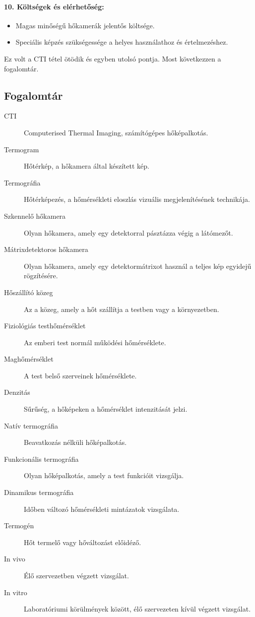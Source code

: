 \documentclass[a4paper,12pt]{article}
\begin{document}
\paragraph{10. Költségek és elérhetőség:} \begin{itemize} \item Magas minőségű hőkamerák jelentős költsége. \item Speciális képzés szükségessége a helyes használathoz és értelmezéshez. \end{itemize}

Ez volt a CTI tétel ötödik és egyben utolsó pontja. Most következzen a fogalomtár.

\subsection{Fogalomtár} 

\begin{description} \item[CTI] Computerised Thermal Imaging, számítógépes hőképalkotás.

\item[Termogram] Hőtérkép, a hőkamera által készített kép. \item[Termográfia] Hőtérképezés, a hőmérsékleti eloszlás vizuális megjelenítésének technikája. \item[Szkennelő hőkamera] Olyan hőkamera, amely egy detektorral pásztázza végig a látómezőt. \item[Mátrixdetektoros hőkamera] Olyan hőkamera, amely egy detektormátrixot használ a teljes kép egyidejű rögzítésére. \item[Hőszállító közeg] Az a közeg, amely a hőt szállítja a testben vagy a környezetben. \item[Fiziológiás testhőmérséklet] Az emberi test normál működési hőmérséklete. \item[Maghőmérséklet] A test belső szerveinek hőmérséklete. \item[Denzitás] Sűrűség, a hőképeken a hőmérséklet intenzitását jelzi. \item[Natív termográfia] Beavatkozás nélküli hőképalkotás. \item[Funkcionális termográfia] Olyan hőképalkotás, amely a test funkcióit vizsgálja. \item[Dinamikus termográfia] Időben változó hőmérsékleti mintázatok vizsgálata. \item[Termogén] Hőt termelő vagy hőváltozást előidéző. \item[In vivo] Élő szervezetben végzett vizsgálat. \item[In vitro] Laboratóriumi körülmények között, élő szervezeten kívül végzett vizsgálat.
\end{description}
\end{document}
